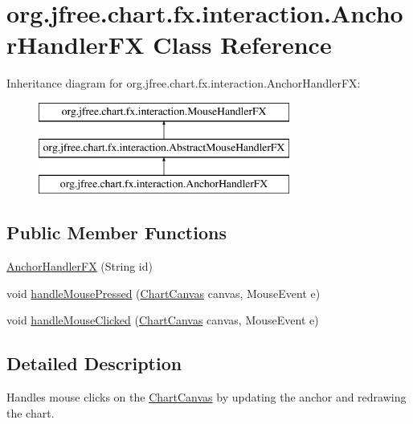 \hypertarget{classorg_1_1jfree_1_1chart_1_1fx_1_1interaction_1_1_anchor_handler_f_x}{}\section{org.\+jfree.\+chart.\+fx.\+interaction.\+Anchor\+Handler\+FX Class Reference}
\label{classorg_1_1jfree_1_1chart_1_1fx_1_1interaction_1_1_anchor_handler_f_x}
Inheritance diagram for org.\+jfree.\+chart.\+fx.\+interaction.\+Anchor\+Handler\+FX\+:\begin{figure}[H]
\begin{center}
\leavevmode
\includegraphics[height=3.000000cm]{classorg_1_1jfree_1_1chart_1_1fx_1_1interaction_1_1_anchor_handler_f_x}
\end{center}
\end{figure}
\subsection*{Public Member Functions}
\begin{DoxyCompactItemize}
\item 
\mbox{\hyperlink{classorg_1_1jfree_1_1chart_1_1fx_1_1interaction_1_1_anchor_handler_f_x_ac4f8aac592687ae9346705601679de3c}{Anchor\+Handler\+FX}} (String id)
\item 
void \mbox{\hyperlink{classorg_1_1jfree_1_1chart_1_1fx_1_1interaction_1_1_anchor_handler_f_x_aae8e995d9a03393fb8eee9d45d81c23b}{handle\+Mouse\+Pressed}} (\mbox{\hyperlink{classorg_1_1jfree_1_1chart_1_1fx_1_1_chart_canvas}{Chart\+Canvas}} canvas, Mouse\+Event e)
\item 
void \mbox{\hyperlink{classorg_1_1jfree_1_1chart_1_1fx_1_1interaction_1_1_anchor_handler_f_x_a1eb3a7adc3693b4a6160032ceb539bb7}{handle\+Mouse\+Clicked}} (\mbox{\hyperlink{classorg_1_1jfree_1_1chart_1_1fx_1_1_chart_canvas}{Chart\+Canvas}} canvas, Mouse\+Event e)
\end{DoxyCompactItemize}


\subsection{Detailed Description}
Handles mouse clicks on the \mbox{\hyperlink{classorg_1_1jfree_1_1chart_1_1fx_1_1_chart_canvas}{Chart\+Canvas}} by updating the anchor and redrawing the chart.

